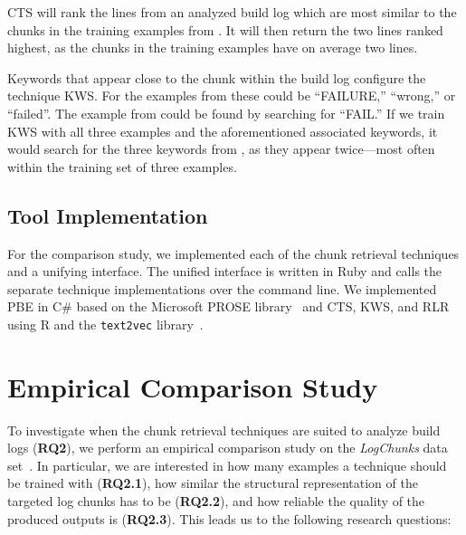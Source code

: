 CTS will rank the lines from an analyzed build log which are most
similar to the chunks in the training examples
from .
It will then return the two lines ranked highest, as the chunks in
the training examples have on average two lines.

Keywords that appear close to the chunk within
the build log configure the technique KWS\@.
For the examples from  these could be
``FAILURE,'' ``wrong,'' or ``failed''.
The example from  could be found
by searching for ``FAIL.''
If we train KWS with all three examples and the aforementioned
associated keywords, it would search for the three keywords from
, as they appear twice---most often within
the training set of three examples.

\subsection{Tool Implementation}
For the comparison study, we implemented each of the chunk retrieval
techniques and a unifying interface.
The unified interface is written in Ruby and
calls the separate technique implementations over the command line.
We implemented PBE in C\# based on the Microsoft PROSE
library~\cite{prose2019webpage} and CTS, KWS, and RLR using
R and the {\tt text2vec} library~\cite{text2vec2019webpage}.


\section{Empirical Comparison Study}


\label{sec:study}

To investigate when the chunk retrieval techniques are suited to
analyze build logs (\textbf{RQ2}), we perform an empirical comparison
study on the \emph{LogChunks} data set~\cite{brandt2020logchunks}.
In particular, we are interested in how many examples a technique
should be trained with (\textbf{RQ2.1}),
how similar the structural representation of the targeted log chunks
has to be (\textbf{RQ2.2}), and how reliable the quality of the
produced outputs is (\textbf{RQ2.3}).
This leads us to the following research questions:

